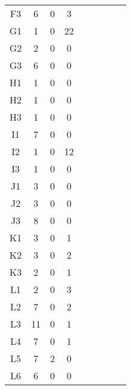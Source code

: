 \begin{center}
\begin{longtable}{ccccc|cccc}
    F3    & 6     & 0     & 3 \\
    G1    & 1     & 0     & 22 \\
    G2    & 2     & 0     & 0 \\
    G3    & 6     & 0     & 0 \\
    H1    & 1     & 0     & 0 \\
    H2    & 1     & 0     & 0 \\
    H3    & 1     & 0     & 0 \\
    I1    & 7     & 0     & 0 \\
    I2    & 1     & 0     & 12 \\
    I3    & 1     & 0     & 0 \\
    J1    & 3     & 0     & 0 \\
    J2    & 3     & 0     & 0 \\
    J3    & 8     & 0     & 0 \\
    K1    & 3     & 0     & 1 \\
    K2    & 3     & 0     & 2 \\
    K3    & 2     & 0     & 1 \\
    L1    & 2     & 0     & 3 \\
    L2    & 7     & 0     & 2 \\
    L3    & 11    & 0     & 1 \\
    L4    & 7     & 0     & 1 \\
    L5    & 7     & 2     & 0 \\
    L6    & 6     & 0     & 0 \\

\end{longtable}
\end{center}

